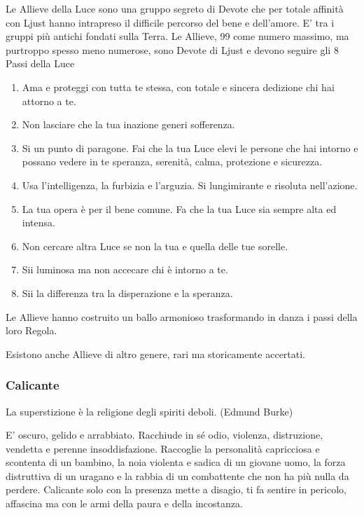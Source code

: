 \begin{multicols}{2}
\medskip

Le Allieve della Luce sono una gruppo segreto di Devote che per totale affinità con Ljust hanno intrapreso il difficile percorso del bene e dell'amore. E' tra i gruppi più antichi fondati sulla Terra. Le Allieve, 99 come numero massimo, ma purtroppo spesso meno numerose, sono Devote di Ljust e devono seguire gli 8 Passi della Luce

\begin{enumerate}[leftmargin=*] \setlength{\itemsep}{0pt}
\item Ama e proteggi con tutta te stessa, con totale e sincera dedizione chi hai attorno a te.
\item Non lasciare che la tua inazione generi sofferenza.
\item Si un punto di paragone. Fai che la tua Luce elevi le persone che hai intorno e possano vedere in te speranza, serenità, calma, protezione e sicurezza.
\item Usa l'intelligenza, la furbizia e l'arguzia. Si lungimirante e risoluta nell'azione.
\item La tua opera è per il bene comune. Fa che la tua Luce sia sempre alta ed intensa.
\item Non cercare altra Luce se non la tua e quella delle tue sorelle.
\item Sii luminosa ma non accecare chi è intorno a te.
\item Sii la differenza tra la disperazione e la speranza.
\end{enumerate}

Le Allieve hanno costruito un ballo armonioso trasformando in danza i passi della loro Regola.

Esistono anche Allieve di altro genere, rari ma storicamente accertati.

\subsubsection{Calicante}\label{calicante}\hypertarget{calicante}{}

\begin{enfasi}{
La superstizione è la religione degli spiriti deboli. (Edmund Burke)
}\end{enfasi}

E' oscuro, gelido e arrabbiato. Racchiude in sé odio, violenza, distruzione, vendetta e perenne insoddisfazione. Raccoglie la personalità capricciosa e scontenta di un bambino, la noia violenta e sadica di un giovane uomo, la forza distruttiva di un uragano e la rabbia di un combattente che non ha più nulla da perdere. Calicante solo con la presenza mette a disagio, ti fa sentire in pericolo, affascina ma con le armi della paura e della incostanza.


\end{multicols}
